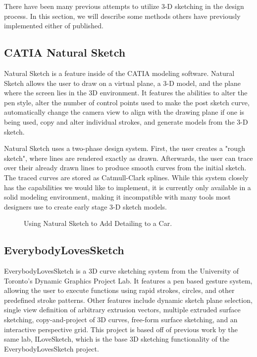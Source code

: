 There have been many previous attempts to utilize 3-D sketching in the design process. In this section, we will describe some methods others have previously implemented either of published.

\subsection{CATIA Natural Sketch}

Natural Sketch is a feature inside of the CATIA modeling software\autocite{catia}. 
Natural Sketch allows the user to draw on a virtual plane, a 3-D model, and the plane where the screen lies in the 3D environment. 
It features the abilities to alter the pen style, alter the number of control points used to make the post sketch curve, automatically change the camera view to align with the drawing plane if one is being used, copy and alter individual strokes, and generate models from the 3-D sketch.

Natural Sketch uses a two-phase design system. 
First, the user creates a "rough sketch", where lines are rendered exactly as drawn. 
Afterwards, the user can trace over their already drawn lines to produce smooth curves from the initial sketch.
The traced curves are stored as Catmull-Clark splines.
While this system closely has the capabilities we would like to implement, it is currently only available in a solid modeling environment, making it incompatible with many tools most designers use to create early stage 3-D sketch models.

\begin{figure}
\centering     %
{}
\caption{Using Natural Sketch to Add Detailing to a Car. \autocite{catiareel}}
\end{figure}

\subsection{EverybodyLovesSketch}

EverybodyLovesSketch\autocite{lovesketch} is a 3D curve sketching system from the University of Toronto's Dynamic Graphics Project Lab. It features a pen based gesture system, allowing the user to execute functions using rapid strokes, circles, and other predefined stroke patterns. Other features include dynamic sketch plane selection, single view definition of arbitrary extrusion vectors, multiple extruded surface sketching, copy-and-project of 3D curves, free-form surface sketching, and an interactive perspective grid. This project is based off of previous work by the same lab, ILoveSketch, which is the base 3D sketching functionality of the EverybodyLovesSketch project.

